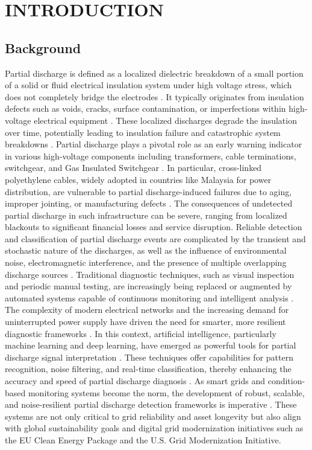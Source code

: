 \chapter{INTRODUCTION}

\section{Background}

Partial discharge is defined as a localized dielectric breakdown of a small portion of a solid or fluid electrical insulation system under high voltage stress, which does not completely bridge the electrodes \parencite{Lu_2020_2}. It typically originates from insulation defects such as voids, cracks, surface contamination, or imperfections within high-voltage electrical equipment \parencite{Hussain_2021, Agarwal_2023}. These localized discharges degrade the insulation over time, potentially leading to insulation failure and catastrophic system breakdowns \parencite{Choudhary_2024_1}. Partial discharge plays a pivotal role as an early warning indicator in various high-voltage components including transformers, cable terminations, switchgear, and Gas Insulated Switchgear \parencite{Hussain_2021, Govindarajan_2023_1}. In particular, cross-linked polyethylene cables, widely adopted in countries like Malaysia for power distribution, are vulnerable to partial discharge-induced failures due to aging, improper jointing, or manufacturing defects \parencite{Rosle_2021, Choudhary_2024_1}. The consequences of undetected partial discharge in such infrastructure can be severe, ranging from localized blackouts to significant financial losses and service disruption. Reliable detection and classification of partial discharge events are complicated by the transient and stochastic nature of the discharges, as well as the influence of environmental noise, electromagnetic interference, and the presence of multiple overlapping discharge sources \parencite{Baug_2017, Ghosh_2020}. Traditional diagnostic techniques, such as visual inspection and periodic manual testing, are increasingly being replaced or augmented by automated systems capable of continuous monitoring and intelligent analysis \parencite{Sikorski_2020}. 
The complexity of modern electrical networks and the increasing demand for uninterrupted power supply have driven the need for smarter, more resilient diagnostic frameworks \parencite{Vatsa_2024}. In this context, artificial intelligence, particularly machine learning and deep learning, have emerged as powerful tools for partial discharge signal interpretation \parencite{Lu_2020_2, Long_2024}. These techniques offer capabilities for pattern recognition, noise filtering, and real-time classification, thereby enhancing the accuracy and speed of partial discharge diagnosis \parencite{Song_2018, Abdullah_2019}. As smart grids and condition-based monitoring systems become the norm, the development of robust, scalable, and noise-resilient partial discharge detection frameworks is imperative \parencite{Jia_2020, Kim_2021}. These systems are not only critical to grid reliability and asset longevity but also align with global sustainability goals and digital grid modernization initiatives such as the EU Clean Energy Package and the U.S. Grid Modernization Initiative.

